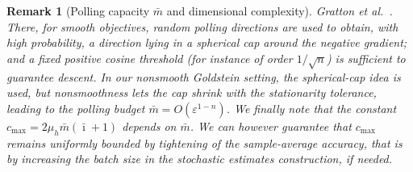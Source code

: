 \documentclass[11pt,a4paper]{article}
\newtheorem{remark}{Remark}[section]
\newcommand{\PP}{\ensuremath{\mathsf P}}
\newcommand{\F}{\mathcal{F}}
\newcommand{\Imax}{\bar{\imath}}%
\newcommand{\EE}{\mathbb{E}}
\begin{document}
\begin{remark}[Polling capacity \(\bar{m}\) and dimensional complexity]
Gratton et al.~\cite[Appendix~B]{GrattonRoyerVicenteZhang2015}. There, for
smooth objectives, random polling directions are used to obtain, with high
probability, a direction lying in a spherical cap around the negative gradient;
and a fixed positive cosine threshold  (for
instance of order \(1/\sqrt n\)) is sufficient to guarantee descent. In our nonsmooth
Goldstein setting, the spherical-cap idea is used, but nonsmoothness lets the cap shrink with the stationarity
tolerance, leading to the polling budget
\(\bar m=O(\varepsilon^{1-n})\). We finally note that the constant
\(c_{\max}=2\mu_h \bar{m}(\Imax+1)\) depends on \(\bar{m}\). We can however
guarantee that \(c_{\max}\) remains uniformly bounded by tightening of
the sample-average accuracy, that is by increasing the batch size in the stochastic estimates construction, if needed.
\end{remark}
\end{document}
